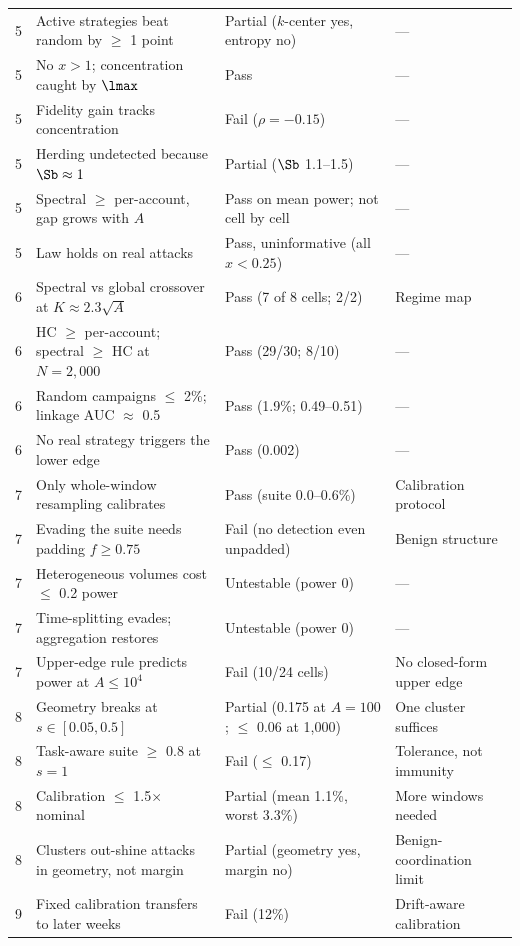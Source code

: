 \begin{longtable}{p{}p{}p{}p{}}
5 & Active strategies beat random by $\ge$ 1 point & Partial ($k$-center yes, entropy no) & --- \\
5 & No $x>1$; concentration caught by $\lmax$ & Pass & --- \\
5 & Fidelity gain tracks concentration & Fail ($\rho=-0.15$) & --- \\
5 & Herding undetected because $\Sb\approx 1$ & Partial ($\Sb$ 1.1--1.5) & --- \\
5 & Spectral $\ge$ per-account, gap grows with $A$ & Pass on mean power; not cell by cell & --- \\
5 & Law holds on real attacks & Pass, uninformative (all $x<0.25$) & --- \\
6 & Spectral vs global crossover at $K\approx 2.3\sqrt A$ & Pass (7 of 8 cells; 2/2) & Regime map \\
6 & HC $\ge$ per-account; spectral $\ge$ HC at $N=2{,}000$ & Pass (29/30; 8/10) & --- \\
6 & Random campaigns $\le$ 2\%; linkage AUC $\approx$ 0.5 & Pass (1.9\%; 0.49--0.51) & --- \\
6 & No real strategy triggers the lower edge & Pass (0.002) & --- \\
7 & Only whole-window resampling calibrates & Pass (suite 0.0--0.6\%) & Calibration protocol \\
7 & Evading the suite needs padding $f\ge 0.75$ & Fail (no detection even unpadded) & Benign structure \\
7 & Heterogeneous volumes cost $\le$ 0.2 power & Untestable (power 0) & --- \\
7 & Time-splitting evades; aggregation restores & Untestable (power 0) & --- \\
7 & Upper-edge rule predicts power at $A\le 10^4$ & Fail (10/24 cells) & No closed-form upper edge \\
8 & Geometry breaks at $s\in[0.05,0.5]$ & Partial (0.175 at $A=100$; $\le$ 0.06 at 1{,}000) & One cluster suffices \\
8 & Task-aware suite $\ge$ 0.8 at $s=1$ & Fail ($\le$ 0.17) & Tolerance, not immunity \\
8 & Calibration $\le$ 1.5$\times$ nominal & Partial (mean 1.1\%, worst 3.3\%) & More windows needed \\
8 & Clusters out-shine attacks in geometry, not margin & Partial (geometry yes, margin no) & Benign-coordination limit \\
9 & Fixed calibration transfers to later weeks & Fail (12\%) & Drift-aware calibration \\

\end{longtable}
